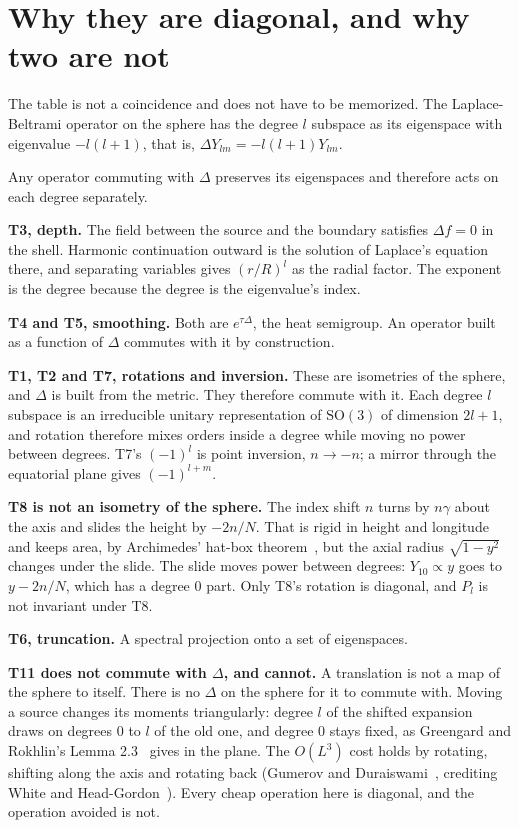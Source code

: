 \section{Why they are diagonal, and why two are not}

The table is not a coincidence and does not have to be memorized. The Laplace-Beltrami operator on the sphere has the degree \(l\) subspace as its eigenspace with eigenvalue \(-l(l+1)\), that is, \(\Delta Y_{lm} = -l(l+1) Y_{lm}\).

Any operator commuting with \(\Delta\) preserves its eigenspaces and therefore acts on each degree separately.

\textbf{T3, depth.} The field between the source and the boundary satisfies \(\Delta f = 0\) in the shell. Harmonic continuation outward is the solution of Laplace's equation there, and separating variables gives \((r/R)^l\) as the radial factor. The exponent is the degree because the degree is the eigenvalue's index.

\textbf{T4 and T5, smoothing.} Both are \(e^{\tau\Delta}\), the heat semigroup. An operator built as a function of \(\Delta\) commutes with it by construction.

\textbf{T1, T2 and T7, rotations and inversion.} These are isometries of the sphere, and \(\Delta\) is built from the metric. They therefore commute with it. Each degree \(l\) subspace is an irreducible unitary representation of \(\mathrm{SO}(3)\) of dimension \(2l+1\), and rotation therefore mixes orders inside a degree while moving no power between degrees. T7's \((-1)^l\) is point inversion, \(n \to -n\); a mirror through the equatorial plane gives \((-1)^{l+m}\).

\textbf{T8 is not an isometry of the sphere.} The index shift \(n\) turns by \(n\gamma\) about the axis and slides the height by \(-2n/N\). That is rigid in height and longitude and keeps area, by Archimedes' hat-box theorem~\cite[\emph{On the Sphere and Cylinder} I, Propositions 33, 42 and 43]{src:Heath-1897}, but the axial radius \(\sqrt{1 - y^2}\) changes under the slide. The slide moves power between degrees: \(Y_{10} \propto y\) goes to \(y - 2n/N\), which has a degree \(0\) part. Only T8's rotation is diagonal, and \(P_l\) is not invariant under T8.

\textbf{T6, truncation.} A spectral projection onto a set of eigenspaces.

\textbf{T11 does not commute with \(\Delta\), and cannot.} A translation is not a map of the sphere to itself. There is no \(\Delta\) on the sphere for it to commute with. Moving a source changes its moments triangularly: degree \(l\) of the shifted expansion draws on degrees \(0\) to \(l\) of the old one, and degree \(0\) stays fixed, as Greengard and Rokhlin's Lemma 2.3~\cite[Section~2]{src:Greengard-and-Rokhlin-1987} gives in the plane. The \(O(L^3)\) cost holds by rotating, shifting along the axis and rotating back (Gumerov and Duraiswami~\cite[Section~1]{src:Gumerov-and-Duraiswami-2014}, crediting White and Head-Gordon~\cite{src:White-and-Head-Gordon-1996}). Every cheap operation here is diagonal, and the operation avoided is not.

